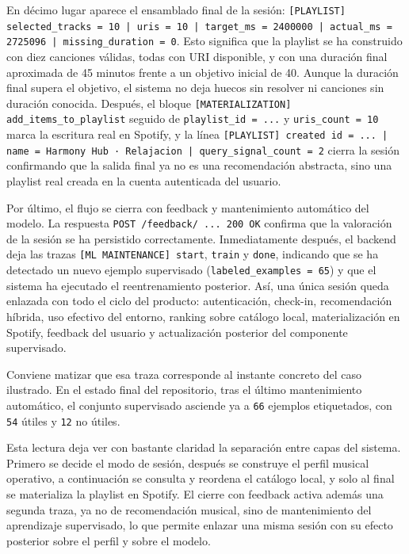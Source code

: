 En décimo lugar aparece el ensamblado final de la sesión:
\texttt{[PLAYLIST] selected\_tracks = 10 | uris = 10 | target\_ms = 2400000 |
actual\_ms = 2725096 | missing\_duration = 0}. Esto significa que la playlist
se ha construido con diez canciones válidas, todas con URI disponible, y con
una duración final aproximada de 45 minutos frente a un objetivo inicial de 40.
Aunque la duración final supera el objetivo, el sistema no deja huecos sin
resolver ni canciones sin duración conocida. Después, el bloque
\texttt{[MATERIALIZATION] add\_items\_to\_playlist} seguido de
\texttt{playlist\_id = ...} y \texttt{uris\_count = 10} marca la escritura
real en Spotify, y la línea \texttt{[PLAYLIST] created id = ... |
name = Harmony Hub · Relajacion | query\_signal\_count = 2} cierra la sesión
confirmando que la salida final ya no es una recomendación abstracta, sino una
playlist real creada en la cuenta autenticada del usuario.

Por último, el flujo se cierra con feedback y mantenimiento automático del
modelo. La respuesta \texttt{POST /feedback/ ... 200 OK} confirma que la
valoración de la sesión se ha persistido correctamente. Inmediatamente después,
el backend deja las trazas \texttt{[ML MAINTENANCE] start},
\texttt{train} y \texttt{done}, indicando que se ha detectado un nuevo ejemplo
supervisado (\texttt{labeled\_examples = 65}) y que el sistema ha ejecutado el
reentrenamiento posterior. Así, una única sesión queda enlazada con todo el
ciclo del producto: autenticación, check-in, recomendación híbrida, uso
efectivo del entorno, ranking sobre catálogo local, materialización en
Spotify, feedback del usuario y actualización posterior del componente
supervisado.

Conviene matizar que esa traza corresponde al instante concreto del caso
ilustrado. En el estado final del repositorio, tras el último mantenimiento
automático, el conjunto supervisado asciende ya a \texttt{66} ejemplos
etiquetados, con \texttt{54} útiles y \texttt{12} no útiles.

Esta lectura deja ver con bastante claridad la separación entre capas del
sistema. Primero se decide el modo de sesión, después se construye el perfil
musical operativo, a continuación se consulta y reordena el catálogo local, y
solo al final se materializa la playlist en Spotify. El cierre con feedback
activa además una segunda traza, ya no de recomendación musical, sino de
mantenimiento del aprendizaje supervisado, lo que permite enlazar una misma
sesión con su efecto posterior sobre el perfil y sobre el modelo.


